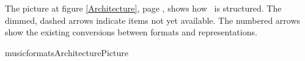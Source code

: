 The picture at figure \ref {Architecture}, page \pageref {Architecture}, shows how \formats\ is structured. The dimmed, dashed arrows indicate items not yet available. 
The numbered arrows show the existing conversions between formats and representations.

{musicformatsArchitecturePicture}

